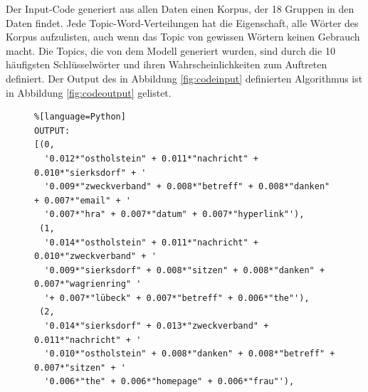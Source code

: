 \documentclass[german,version-2020-11]{uzl-thesis}
\begin{document}
Der Input-Code generiert aus allen Daten einen Korpus, der 18 Gruppen in den Daten findet. Jede Topic-Word-Verteilungen hat die Eigenschaft, alle Wörter des Korpus aufzulisten, auch wenn das Topic von gewissen Wörtern keinen Gebrauch macht. Die Topics, die von dem Modell generiert wurden, sind durch die 10 häufigsten Schlüsselwörter und ihren Wahrscheinlichkeiten zum Auftreten definiert. Der Output des in Abbildung \ref{fig:codeinput} definierten Algorithmus ist in Abbildung \ref{fig:codeoutput} gelistet. 

\begin{figure}[H]
\begin{lstlisting}%[language=Python]
OUTPUT:
[(0,
  '0.012*"ostholstein" + 0.011*"nachricht" + 0.010*"sierksdorf" + '
  '0.009*"zweckverband" + 0.008*"betreff" + 0.008*"danken" + 0.007*"email" + '
  '0.007*"hra" + 0.007*"datum" + 0.007*"hyperlink"'),
 (1,
  '0.014*"ostholstein" + 0.011*"nachricht" + 0.010*"zweckverband" + '
  '0.009*"sierksdorf" + 0.008*"sitzen" + 0.008*"danken" + 0.007*"wagrienring" '
  '+ 0.007*"lübeck" + 0.007*"betreff" + 0.006*"the"'),
 (2,
  '0.014*"sierksdorf" + 0.013*"zweckverband" + 0.011*"nachricht" + '
  '0.010*"ostholstein" + 0.008*"danken" + 0.008*"betreff" + 0.007*"sitzen" + '
  '0.006*"the" + 0.006*"homepage" + 0.006*"frau"'),
  \end{lstlisting}
  \end{figure}
  \newpage
\end{document}
